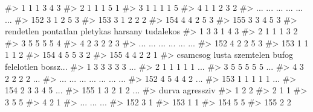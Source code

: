 \documentclass[
  letterpaper,
]{krantz}
\makeatletter
\newenvironment{Shaded}{\begin{snugshade}}{\end{snugshade}}
\newcommand{\CommentTok}[1]{\textcolor[rgb]{0.37,0.37,0.37}{#1}}
\newenvironment{kframe}{%
\medskip{}
\setlength{\fboxsep}{.8em}
 \def\at@end@of@kframe{}%
 \ifinner\ifhmode%
  \def\at@end@of@kframe{\end{minipage}}%
  \begin{minipage}{\columnwidth}%
 \fi\fi%
 \def\FrameCommand##1{\hskip\@totalleftmargin \hskip-\fboxsep
 \colorbox{shadecolor}{##1}\hskip-\fboxsep
     \hskip-\linewidth \hskip-\@totalleftmargin \hskip\columnwidth}%
 \MakeFramed {\advance\hsize-\width
   \@totalleftmargin\z@ \linewidth\hsize
   \@setminipage}}%
 {\par\unskip\endMakeFramed%
 \at@end@of@kframe}
\renewenvironment{Shaded}{\begin{kframe}}{\end{kframe}}
\makeatother
\begin{document}
\begin{Shaded}
\begin{Highlighting}[]
\CommentTok{\#\textgreater{} 1         1          1        3         4           3}
\CommentTok{\#\textgreater{} 2         1          1        1         5           1}
\CommentTok{\#\textgreater{} 3         1          1        1         1           5}
\CommentTok{\#\textgreater{} 4         1          1        2         3           2}
\CommentTok{\#\textgreater{} ...     ...        ...      ...       ...         ...}
\CommentTok{\#\textgreater{} 152       3          1        2         5           3}
\CommentTok{\#\textgreater{} 153       3          1        2         2           2}
\CommentTok{\#\textgreater{} 154       4          4        2         5           3}
\CommentTok{\#\textgreater{} 155       3          3        4         5           3}
\CommentTok{\#\textgreater{}     rendetlen pontatlan pletykas harsany tudalekos}
\CommentTok{\#\textgreater{} 1           3         3        1       4         3}
\CommentTok{\#\textgreater{} 2           1         1        1       3         2}
\CommentTok{\#\textgreater{} 3           5         5        5       5         4}
\CommentTok{\#\textgreater{} 4           2         3        2       2         3}
\CommentTok{\#\textgreater{} ...       ...       ...      ...     ...       ...}
\CommentTok{\#\textgreater{} 152         4         2        2       5         3}
\CommentTok{\#\textgreater{} 153         1         1        1       1         2}
\CommentTok{\#\textgreater{} 154         4         5        5       3         2}
\CommentTok{\#\textgreater{} 155         4         4        2       2         1}
\CommentTok{\#\textgreater{}     csamcsog lusta szemtelen bufog felelotlen bossz...}
\CommentTok{\#\textgreater{} 1          3     3         3     3          3      ...}
\CommentTok{\#\textgreater{} 2          1     1         1     1          1      ...}
\CommentTok{\#\textgreater{} 3          5     5         5     5          5      ...}
\CommentTok{\#\textgreater{} 4          3     2         2     2          2      ...}
\CommentTok{\#\textgreater{} ...      ...   ...       ...   ...        ...      ...}
\CommentTok{\#\textgreater{} 152        4     5         4     4          2      ...}
\CommentTok{\#\textgreater{} 153        1     1         1     1          1      ...}
\CommentTok{\#\textgreater{} 154        2     3         3     4          5      ...}
\CommentTok{\#\textgreater{} 155        1     3         2     1          2      ...}
\CommentTok{\#\textgreater{}     durva agressziv}
\CommentTok{\#\textgreater{} 1       2         2}
\CommentTok{\#\textgreater{} 2       1         1}
\CommentTok{\#\textgreater{} 3       5         5}
\CommentTok{\#\textgreater{} 4       2         1}
\CommentTok{\#\textgreater{} ...   ...       ...}
\CommentTok{\#\textgreater{} 152     3         1}
\CommentTok{\#\textgreater{} 153     1         1}
\CommentTok{\#\textgreater{} 154     5         5}
\CommentTok{\#\textgreater{} 155     2         2}
\end{Highlighting}
\end{Shaded}
\end{document}
